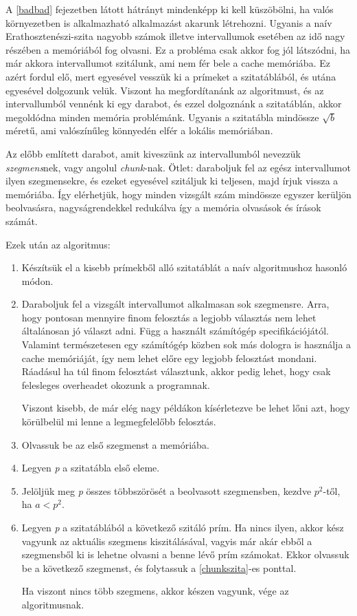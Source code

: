 \documentclass[twoside, a4paper, 12pt]{article}
\begin{document}
A \ref{badbad} fejezetben látott hátrányt mindenképp ki kell küszöbölni, ha valós környezetben is alkalmazható alkalmazást akarunk létrehozni. Ugyanis a naív Erathosztenészi-szita nagyobb számok illetve intervallumok esetében az idő nagy részében a memóriából fog olvasni. Ez a probléma csak akkor fog jól látszódni, ha már akkora intervallumot szitálunk, ami nem fér bele a cache memóriába. Ez azért fordul elő, mert egyesével vesszük ki a prímeket a szitatáblából, és utána egyesével dolgozunk velük. Viszont ha megfordítanánk az algoritmust, és az intervallumból vennénk ki egy darabot, és ezzel dolgoznánk a szitatáblán, akkor megoldódna minden memória problémánk. Ugyanis a szitatábla mindössze $\sqrt{b}$ méretű, ami valószínűleg könnyedén elfér a lokális memóriában. \par 
Az előbb említett darabot, amit kiveszünk az intervallumból nevezzük \textit{szegmens}nek, vagy angolul \textit{chunk}-nak. Ötlet: daraboljuk fel az egész intervallumot ilyen szegmensekre, és ezeket egyesével szitáljuk ki teljesen, majd írjuk vissza a memóriába. Így elérhetjük, hogy minden vizsgált szám mindössze egyszer kerüljön beolvasásra, nagyságrendekkel redukálva így a memória olvasások és írások számát. \par
Ezek után az algoritmus: \par
\begin{enumerate}
\item Készítsük el a kisebb prímekből alló szitatáblát a naív algoritmushoz hasonló módon.
\item Daraboljuk fel a vizsgált intervallumot alkalmasan sok szegmensre. Arra, hogy pontosan mennyire finom felosztás a legjobb választás nem lehet általánosan jó választ adni. Függ a használt számítógép specifikációjától. Valamint természetesen egy számítógép közben sok más dologra is használja a cache memóriáját, így nem lehet előre egy legjobb felosztást mondani. Ráadásul ha túl finom felosztást választunk, akkor pedig lehet, hogy csak felesleges overheadet okozunk a programnak. \par
Viszont kisebb, de már elég nagy példákon kísérletezve be lehet lőni azt, hogy körülbelül mi lenne a legmegfelelőbb felosztás.
\item Olvassuk be az első szegmenst a memóriába.
\item Legyen \textit{p} a szitatábla első eleme. \label{chunkszita}
\item Jelöljük meg \textit{p} összes többszörösét a beolvasott szegmensben, kezdve $p^2$-től, ha $a<p^2$.
\item Legyen \textit{p} a szitatáblából a következő szitáló prím. Ha nincs ilyen, akkor kész vagyunk az aktuális szegmens kiszitálásával, vagyis már akár ebből a szegmensből ki is lehetne olvasni a benne lévő prím számokat. Ekkor olvassuk be a következő szegmenst, és folytassuk a \ref{chunkszita}-es ponttal. \par
Ha viszont nincs több szegmens, akkor készen vagyunk, vége az algoritmusnak. 
\end{enumerate}
\end{document}
